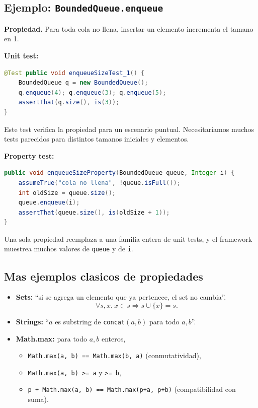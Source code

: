 \documentclass[12pt,a4paper]{article}
\begin{document}
\subsection{Ejemplo: \texttt{BoundedQueue.enqueue}}

\textbf{Propiedad.} Para toda cola no llena, insertar un elemento incrementa el tamano en 1.

\textbf{Unit test:}
\begin{lstlisting}[style=codestyle,language=Java]
@Test public void enqueueSizeTest_1() {
    BoundedQueue q = new BoundedQueue();
    q.enqueue(4); q.enqueue(3); q.enqueue(5);
    assertThat(q.size(), is(3));
}
\end{lstlisting}

Este test verifica la propiedad para un escenario puntual. Necesitariamos muchos tests
parecidos para distintos tamanos iniciales y elementos.

\textbf{Property test:}
\begin{lstlisting}[style=codestyle,language=Java]
public void enqueueSizeProperty(BoundedQueue queue, Integer i) {
    assumeTrue("cola no llena", !queue.isFull());
    int oldSize = queue.size();
    queue.enqueue(i);
    assertThat(queue.size(), is(oldSize + 1));
}
\end{lstlisting}

Una sola propiedad reemplaza a una familia entera de unit tests, y el framework muestrea
muchos valores de \texttt{queue} y de \texttt{i}.

\subsection{Mas ejemplos clasicos de propiedades}

\begin{itemize}
  \item \textbf{Sets:} ``si se agrega un elemento que ya pertenece, el set no cambia''.
  $$\forall s, x.\ x \in s \Rightarrow s \cup \{x\} = s.$$
  \item \textbf{Strings:} ``$a$ es substring de \texttt{concat}$(a, b)$ para todo $a, b$''.
  \item \textbf{Math.max:} para todo $a, b$ enteros,
  \begin{itemize}
    \item \texttt{Math.max(a, b) == Math.max(b, a)} (conmutatividad),
    \item \texttt{Math.max(a, b) >= a} y \texttt{>= b},
    \item \texttt{p + Math.max(a, b) == Math.max(p+a, p+b)} (compatibilidad con suma).
  \end{itemize}
\end{itemize}
\end{document}
